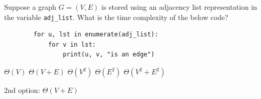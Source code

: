 \begin{prob}
    Suppose a graph $G = (V, E)$ is stored using an adjacency list representation in
    the variable \texttt{adj_list}.
    What is the time complexity of the below code?

    \begin{verbatim}
        for u, lst in enumerate(adj_list):
            for v in lst:
                print(u, v, "is an edge")
    \end{verbatim}

    \begin{choices}
        \choice $\Theta(V)$
        \correctchoice $\Theta(V + E)$
        \choice $\Theta(V^2)$
        \choice $\Theta(E^2)$
        \choice $\Theta(V^2 + E^2)$
    \end{choices}

    \begin{soln}
        2nd option: $\Theta(V + E)$
    \end{soln}

\end{prob}